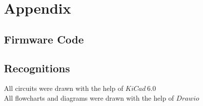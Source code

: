 \section{Appendix}
\subsection{Firmware Code}



\vspace{2cm}

\subsection{Recognitions}
\label{Recognitions}
All circuits were drawn with the help of $KiCad\ 6.0$\\

\noindent All flowcharts and diagrams were drawn with the help of $Drawio$

